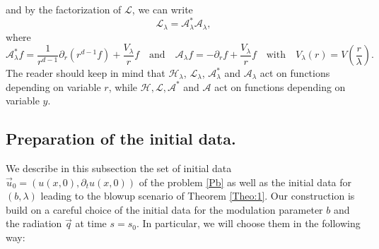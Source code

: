 \documentclass[11pt]{aims}
\theoremstyle{definition}
\numberwithin{equation}{section}
\begin{document}
and by the factorization of ${\mathscr{L}}$, we can write
$${\mathscr{L}}_\lambda  = {\mathscr{A}}^*_\lambda {\mathscr{A}}_\lambda,$$
where 
$${\mathscr{A}}^*_\lambda f = \frac{1}{r^{d-1}}{\partial_r}(r^{d-1}f) + \frac{V_\lambda}{r}f  \quad \text{and} \quad {\mathscr{A}}_\lambda f= -{\partial_r} f + \frac{V_\lambda}{r}f \quad \text{with} \quad V_\lambda(r) = V\left(\frac{r}{\lambda}\right).$$
The reader should keep in mind that ${\mathscr{H}}_\lambda$, ${\mathscr{L}}_\lambda$, ${\mathscr{A}}^*_\lambda$ and ${\mathscr{A}}_\lambda$ act on functions depending on variable $r$, while ${\mathscr{H}}, {\mathscr{L}}, {\mathscr{A}}^*$ and ${\mathscr{A}}$ act on functions depending on variable $y$. 

\subsection{Preparation of the initial data.}
We describe in this subsection the set of initial data $\vec u_0 = (u(x,0), {\partial_t} u(x,0))$ of the problem \eqref{Pb} as well as the initial data for $(b, \lambda)$ leading to the blowup scenario of Theorem \ref{Theo:1}. Our construction is build on a careful choice of the initial data for the modulation parameter $b$ and the radiation $\vec q$ at time $s = s_0$. In particular, we will choose them in the following way:
\end{document}
